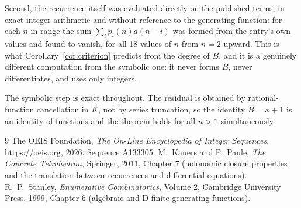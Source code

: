 \documentclass[11pt,a4paper]{article}
\theoremstyle{plain}
\theoremstyle{definition}
\begin{document}
Second, the recurrence itself was evaluated directly on the published terms, in exact
integer arithmetic and without reference to the generating function: for each $n$ in range
the sum $\sum_{i}p_{i}(n)a(n-i)$ was formed from the entry's own values and found to
vanish, for all 18 values of $n$ from $n=2$ upward. This is what
Corollary~\ref{cor:criterion} predicts from the degree of $B$, and it is a genuinely
different computation from the symbolic one: it never forms $B$, never differentiates, and
uses only integers.

The symbolic step is exact throughout. The residual is obtained by rational-function
cancellation in $K$, not by series truncation, so the identity $B=x + 1$ is an
identity of functions and the theorem holds for all $n>1$ simultaneously.

\begin{thebibliography}{9}
 The OEIS Foundation, \emph{The On-Line Encyclopedia of Integer Sequences},
\url{https://oeis.org}, 2026. Sequence A133305.
 M.~Kauers and P.~Paule, \emph{The Concrete Tetrahedron}, Springer, 2011,
Chapter 7 (holonomic closure properties and the translation between recurrences and
differential equations).
 R.~P.~Stanley, \emph{Enumerative Combinatorics}, Volume 2, Cambridge
University Press, 1999, Chapter 6 (algebraic and D-finite generating functions).
\end{thebibliography}
\end{document}

